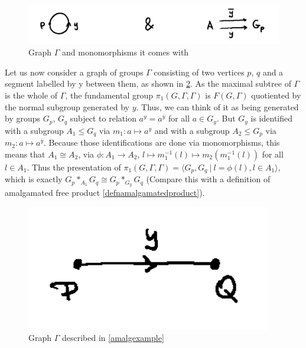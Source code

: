 \begin{figure}[h]
    \centering
    \includegraphics[width=0.5\linewidth]{sections/alicja/HNN loop and monomorphisms.jpeg}
    \caption{Graph $\Gamma$ and monomorphisms it comes with}
    \label{loopHNN}
\end{figure}

\begin{example}\cite[section I.5.1]{Ser80}\label{amalgexample}
    Let us now consider a graph of groups $\Gamma$ consisting of two vertices $p$, $q$ and a segment labelled by y between them, as shown in \ref{amalggraph}. As the maximal subtree of $\Gamma$ is the whole of $\Gamma$, the fundamental group $\pi_1(G,\Gamma,\Gamma)$ is $F(G,\Gamma)$ quotiented by the normal subgroup generated by $y$. Thus, we can think of it as being generated by groups $G_p$, $G_q$ subject to relation $a^y = a^{\overline{y}}$ for all $a \in G_y$. But $G_y$ is identified with a subgroup $A_1 \le G_q$ via $m_1 : a \mapsto a^y$ and with a subgroup $A_2 \le G_p$ via $m_2: a \mapsto a^{\overline{y}}$. Because those identifications are done via monomorphisms, this means that $A_1 \cong A_2$, via $\phi: A_1 \to A_2$, $l \mapsto m_1^{-1}(l) \mapsto m_2(m_1^{-1}(l))$ for all $l \in A_1$. Thus the presentation of $\pi_1(G,\Gamma,\Gamma) = \langle G_p,G_q \: | \: l = \phi(l), l \in A_1\rangle$, which is exactly $G_p\ast_{A_1}G_q \cong G_p \ast_{G_y}G_q$ (Compare this with a definition of amalgamated free product \ref{defnamalgamatedproduct}).
\end{example}



\begin{figure}[h]
    \centering
    \includegraphics[scale = 0.14]{sections/alicja/Segment of groups.jpeg}
    \caption{Graph $\Gamma$ described in \ref{amalgexample}}
    \label{amalggraph}
\end{figure}

